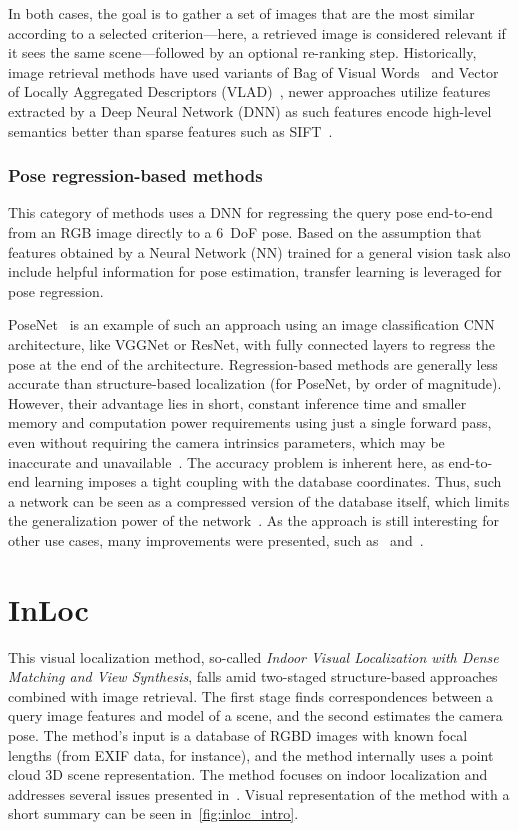 In both cases, the goal is to gather a set of images that are the most similar according to a selected
criterion---here, a retrieved image is considered relevant if it sees the same scene---followed by an
optional re-ranking step. Historically, image retrieval methods have used variants of Bag of Visual Words~\citep{BoVW}
and Vector of Locally Aggregated Descriptors (VLAD)~\citep{VLAD},
newer approaches utilize features extracted by a Deep Neural Network (DNN) as such features encode high-level semantics
better than sparse features such as SIFT~\citep{RetrievalEE, DNNRegression, hausler2021patchnetvlad}.

\subsubsection*{Pose regression-based methods}

This category of methods uses a DNN for regressing the query pose end-to-end from an RGB image
directly to a 6~DoF pose. Based on the assumption that features obtained by a Neural Network (NN) trained for a general vision task
also include helpful information for pose estimation, transfer learning is leveraged for pose regression.

PoseNet~\citep{PoseNet} is an example of such an approach using an image classification CNN architecture, like
VGGNet or ResNet, with fully connected layers to regress the pose at the end of the architecture. Regression-based
methods are generally less accurate than structure-based localization (for PoseNet, by order of magnitude).
However, their advantage lies in short, constant inference time and smaller memory and computation power requirements
using just a single forward pass, even without requiring the camera intrinsics parameters, which may be
inaccurate and unavailable~\citep{RegressionAutoEnc}. The accuracy problem is inherent here, as end-to-end
learning imposes a tight coupling with the database coordinates. Thus, such a network can be seen as a compressed
version of the database itself, which limits the generalization power of the network~\citep{naverlabs}. As the approach is still
interesting for other use cases, many improvements were presented, such as~\citet{DNNRegression, Maps, VLocNet}
and~\citet{VLocNetpp}.


\section{InLoc}\label{sec:inloc}
This visual localization method, so-called \emph{Indoor Visual Localization with Dense Matching
and View Synthesis}, falls amid two-staged structure-based approaches combined with image retrieval. The first stage finds
correspondences between a query image features and model of a scene, and the second estimates the camera pose.
The method's input is a database of RGBD
images with known focal lengths (from EXIF data, for instance), and the method internally uses a point cloud 3D scene
representation. The method focuses on indoor localization and addresses several
issues presented in~. Visual representation of the method with a short summary can be seen in~\cref{fig:inloc_intro}.

